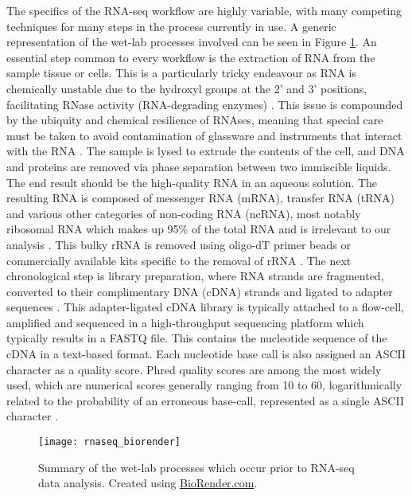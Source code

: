 The specifics of the RNA-seq workflow are highly variable, with many competing techniques for many steps in the process currently in use. A generic representation of the wet-lab processes involved can be seen in Figure \ref{fig:rnaseq_biorender}. An essential step common to every workflow is the extraction of RNA from the sample tissue or cells. This is a particularly tricky endeavour as RNA is chemically unstable due to the hydroxyl groups at the 2' and 3' positions, facilitating RNase activity (RNA-degrading enzymes) \citep{green2019win}. This issue is compounded by the ubiquity and chemical resilience of RNAses, meaning that special care must be taken to avoid contamination of glassware and instruments that interact with the RNA \citep{green2019win}. The sample is lysed to extrude the contents of the cell, and DNA and proteins are removed via phase separation between two immiscible liquids. The end result should be the high-quality RNA in an aqueous solution. The resulting RNA is composed of messenger RNA (mRNA), transfer RNA (tRNA) and various other categories of non-coding RNA (ncRNA), most notably ribosomal RNA which makes up 95\% of the total RNA and is irrelevant to our analysis \citep{kukurba2015rna}. This bulky rRNA is removed using oligo-dT primer beads or commercially available kits specific to the removal of rRNA \citep{peano2013efficient}. The next chronological step is library preparation, where RNA strands are fragmented, converted to their complimentary DNA (cDNA) strands and ligated to adapter sequences \citep{zhong2011high}. This adapter-ligated cDNA library is typically attached to a flow-cell, amplified and sequenced in a high-throughput sequencing platform which typically results in a FASTQ \citep{cock2010sanger} file. %
This contains the nucleotide sequence of the cDNA in a text-based format. Each nucleotide base call is also assigned an ASCII character as a quality score. Phred quality scores are among the most widely used, which are numerical scores generally ranging from 10 to 60, logarithmically related to the probability of an erroneous base-call, represented as a single ASCII character \citep{ewing1998base}.

\begin{figure}[ht!]
  \centering
  \texttt{[image: rnaseq\_biorender]}
  \caption[Summary of the wet-lab processes which occur prior to RNA-seq data analysis.]{Summary of the wet-lab processes which occur prior to RNA-seq data analysis. Created using \href{https://biorender.com/}{BioRender.com}.}
  \label{fig:rnaseq_biorender}
\end{figure}

